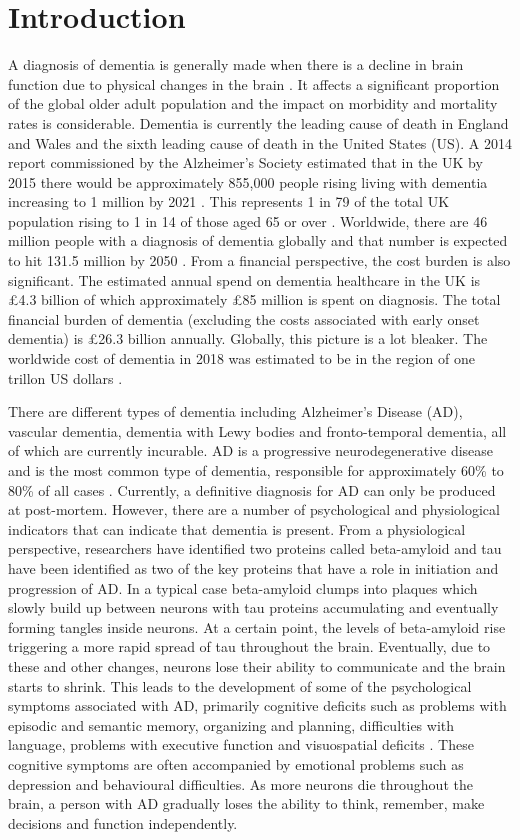\documentclass[10pt, letterpaper, twoside, openany]{thesis}
\begin{document}
\section{Introduction}\label{introduction}
A diagnosis of dementia is generally made when there is a decline in brain function due to physical changes in the brain \cite{Albert2011}. It affects a significant proportion of the global older adult population and the impact on morbidity and mortality rates is considerable. Dementia is currently the leading cause of death in England and Wales and the sixth leading cause of death in the United States (US). A 2014 report commissioned by the Alzheimer's Society estimated that in the UK by 2015 there would be approximately 855,000 people rising living with dementia increasing to 1 million by 2021 \cite{AlzheimersSociety2014}. This represents 1 in 79 of the total UK population rising to 1 in 14 of those aged 65 or over \cite{AlzheimersSociety2014}. Worldwide, there are 46 million people with a diagnosis of dementia globally and that number is expected to hit 131.5 million by 2050 \cite{Prince2015}. From a financial perspective, the cost burden is also significant. The estimated annual spend on dementia healthcare in the UK is £4.3 billion of which approximately £85 million is spent on diagnosis. The total financial burden of dementia (excluding the costs associated with early onset dementia) is £26.3 billion annually. Globally, this picture is a lot bleaker. The worldwide cost of dementia in 2018 was estimated to be in the region of one trillon US dollars \cite{Prince2015}.
\par 
There are different types of dementia including Alzheimer's Disease (AD), vascular dementia, dementia with Lewy bodies and fronto-temporal dementia, all of which are currently incurable. AD is a progressive neurodegenerative disease and is the most common type of dementia, responsible for approximately 60\% to 80\% of all cases \cite{Duong2017}. Currently, a definitive diagnosis for AD can only be produced at post-mortem. However, there are a number of psychological and physiological indicators that can indicate that dementia is present. From a physiological perspective, researchers have identified two proteins called beta-amyloid and tau have been identified as two of the key proteins that have a role in initiation and progression of AD. In a typical case beta-amyloid clumps into plaques which slowly build up between neurons with tau proteins accumulating and eventually forming tangles inside neurons. At a certain point, the levels of beta-amyloid rise triggering a more rapid spread of tau throughout the brain. Eventually, due to these and other changes, neurons lose their ability to communicate and the brain starts to shrink\cite{Duong2017}. This leads to the development of some of the psychological symptoms associated with AD, primarily cognitive deficits such as problems with episodic and semantic memory, organizing and planning, difficulties with language, problems with executive function and visuospatial deficits \cite{McKhann2011}. These cognitive symptoms are often accompanied by emotional problems such as depression and behavioural difficulties. As more neurons die throughout the brain, a person with AD gradually loses the ability to think, remember, make decisions and function independently.
\end{document}
